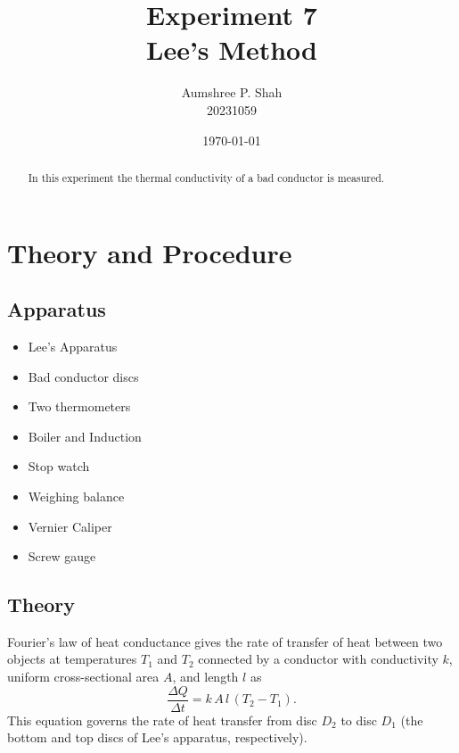 \documentclass[%
 reprint,
 sor,
 jor,
 amsmath,amssymb,
 aps,
]{revtex4-2}
\begin{document}
\title{Experiment 7\\Lee's Method}

\author{Aumshree P. Shah\\20231059}
\date{\today}

\begin{abstract}
\centering
In this experiment the thermal conductivity of a bad conductor is measured. 
\end{abstract}

\maketitle

\section{Theory and Procedure}
\subsection{Apparatus}
\small
\begin{minipage}{0.48\textwidth}
\begin{itemize}
\item Lee’s Apparatus \item Bad conductor discs \item Two thermometers \item Boiler and Induction 
\end{itemize}
\end{minipage}
\begin{minipage}{0.48\textwidth}
\begin{itemize}
	\item Stop watch \item Weighing balance \item Vernier Caliper \item Screw gauge
\end{itemize}
\end{minipage}
\subsection{Theory}
Fourier’s law of heat conductance gives the rate of transfer of heat between two objects at temperatures ${T_1}$ and ${T_2}$ connected by a conductor with conductivity $k$, uniform cross-sectional area $A$, and length $l$ as 
\[
\frac{\Delta Q}{\Delta t} = k\,A\,l\,\left({T_2}-{T_1}\right).
\]
This equation governs the rate of heat transfer from disc ${D_2}$ to disc ${D_1}$ (the bottom and top discs of Lee’s apparatus, respectively).\\
\end{document}
